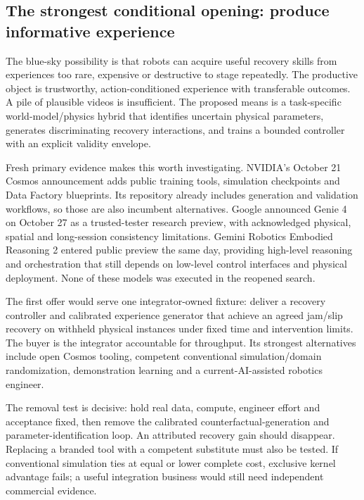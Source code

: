 \subsection{The strongest conditional opening: produce informative experience}
The blue-sky possibility is that robots can acquire useful recovery skills from experiences too rare, expensive or destructive to stage repeatedly. The productive object is trustworthy, action-conditioned experience with transferable outcomes. A pile of plausible videos is insufficient. The proposed means is a task-specific world-model/physics hybrid that identifies uncertain physical parameters, generates discriminating recovery interactions, and trains a bounded controller with an explicit validity envelope.

Fresh primary evidence makes this worth investigating. NVIDIA's October 21 Cosmos announcement adds public training tools, simulation checkpoints and Data Factory blueprints. Its repository already includes generation and validation workflows, so those are also incumbent alternatives. Google announced Genie 4 on October 27 as a trusted-tester research preview, with acknowledged physical, spatial and long-session consistency limitations. Gemini Robotics Embodied Reasoning 2 entered public preview the same day, providing high-level reasoning and orchestration that still depends on low-level control interfaces and physical deployment. None of these models was executed in the reopened search.\cite{cosmos,cosmosfactory,genie4,roboticser2}

The first offer would serve one integrator-owned fixture: deliver a recovery controller and calibrated experience generator that achieve an agreed jam/slip recovery on withheld physical instances under fixed time and intervention limits. The buyer is the integrator accountable for throughput. Its strongest alternatives include open Cosmos tooling, competent conventional simulation/domain randomization, demonstration learning and a current-AI-assisted robotics engineer.

The removal test is decisive: hold real data, compute, engineer effort and acceptance fixed, then remove the calibrated counterfactual-generation and parameter-identification loop. An attributed recovery gain should disappear. Replacing a branded tool with a competent substitute must also be tested. If conventional simulation ties at equal or lower complete cost, exclusive kernel advantage fails; a useful integration business would still need independent commercial evidence.


